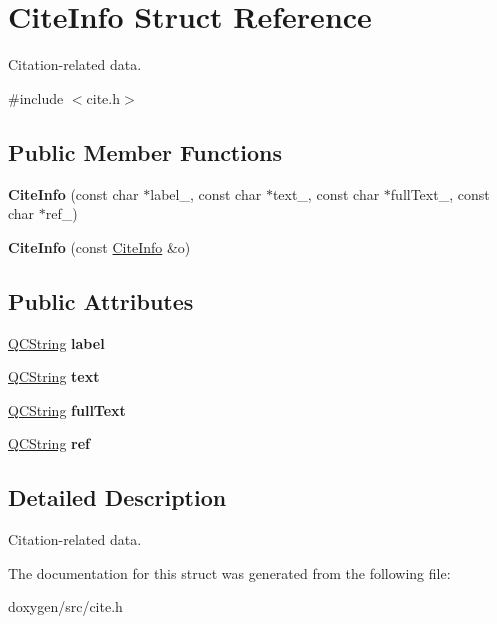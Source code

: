 \hypertarget{struct_cite_info}{}\section{Cite\+Info Struct Reference}
\label{struct_cite_info}


Citation-\/related data.  




{\ttfamily \#include $<$cite.\+h$>$}

\subsection*{Public Member Functions}
\begin{DoxyCompactItemize}
\item 
\mbox{\label{struct_cite_info_a2546c0db77c9357896fe497171ff2b51}} 
{\bfseries Cite\+Info} (const char $\ast$label\+\_\+, const char $\ast$text\+\_, const char $\ast$full\+Text\+\_, const char $\ast$ref\+\_)
\item 
\mbox{\label{struct_cite_info_ac9e08095b548dfb6d1e78197de8d222a}} 
{\bfseries Cite\+Info} (const \mbox{\hyperlink{struct_cite_info}{Cite\+Info}} \&o)
\end{DoxyCompactItemize}
\subsection*{Public Attributes}
\begin{DoxyCompactItemize}
\item 
\mbox{\label{struct_cite_info_a890d06cbf9082f55099c244a53319ea2}} 
\mbox{\hyperlink{class_q_c_string}{Q\+C\+String}} {\bfseries label}
\item 
\mbox{\label{struct_cite_info_a2823a2e8898a833bacf931d188e1fd19}} 
\mbox{\hyperlink{class_q_c_string}{Q\+C\+String}} {\bfseries text}
\item 
\mbox{\label{struct_cite_info_a0afbc201283c71463729e97ff3e981df}} 
\mbox{\hyperlink{class_q_c_string}{Q\+C\+String}} {\bfseries full\+Text}
\item 
\mbox{\label{struct_cite_info_a5d290206c0dc2efaf99b253c4413aac6}} 
\mbox{\hyperlink{class_q_c_string}{Q\+C\+String}} {\bfseries ref}
\end{DoxyCompactItemize}


\subsection{Detailed Description}
Citation-\/related data. 

The documentation for this struct was generated from the following file\+:\begin{DoxyCompactItemize}
\item 
doxygen/src/cite.\+h\end{DoxyCompactItemize}
